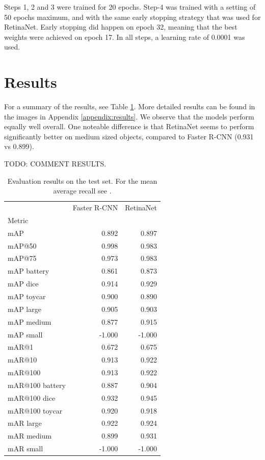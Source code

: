 \documentclass{article}
\begin{document}
Steps 1, 2 and 3 were trained for 20 epochs. Step-4 was trained with a setting of 50 epochs maximum, and with the same early stopping strategy that was used for RetinaNet. Early stopping did happen on epoch 32, meaning that the best weights were achieved on epoch 17. In all steps, a learning rate of 0.0001 was used.

\section{Results}
For a summary of the results, see Table \ref{table:test_map}. More detailed results can be found in the images in Appendix \ref{appendix:results}. We observe that the models perform equally well overall. One noteable difference is that RetinaNet seems to perform significantly better on medium sized objects, compared to Faster R-CNN (0.931 vs 0.899).

TODO: COMMENT RESULTS.

\begin{table}[h]
    \centering
    \begin{tabular}{lrr}
        \toprule
                        & Faster R-CNN & RetinaNet \\
        Metric          &              &           \\
        \midrule
        mAP             & 0.892        & 0.897     \\
        mAP@50          & 0.998        & 0.983     \\
        mAP@75          & 0.973        & 0.983     \\
        mAP battery     & 0.861        & 0.873     \\
        mAP dice        & 0.914        & 0.929     \\
        mAP toycar      & 0.900        & 0.890     \\
        mAP large       & 0.905        & 0.903     \\
        mAP medium      & 0.877        & 0.915     \\
        mAP small       & -1.000       & -1.000    \\
        mAR@1           & 0.672        & 0.675     \\
        mAR@10          & 0.913        & 0.922     \\
        mAR@100         & 0.913        & 0.922     \\
        mAR@100 battery & 0.887        & 0.904     \\
        mAR@100 dice    & 0.932        & 0.945     \\
        mAR@100 toycar  & 0.920        & 0.918     \\
        mAR large       & 0.922        & 0.924     \\
        mAR medium      & 0.899        & 0.931     \\
        mAR small       & -1.000       & -1.000    \\
        \bottomrule
    \end{tabular}
    \caption{Evaluation results on the test set. For the mean average recall see \cite{mar}.}
    \label{table:test_map}
\end{table}
\end{document}
